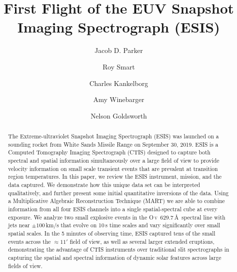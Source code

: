 \renewcommand\arcmin{\mbox{$^\prime$}}
\renewcommand\arcsec{\mbox{$^{\prime\prime}$}}

\newcommand{\rts}[1]{{\color{violet} RTS: #1}} %
\newcommand{\jdp}[1]{{\color{red} JDP: #1}} %
\newcommand{\cck}[1]{{\color{brown} #1}} %
\newcommand{\amy}[1]{{\color{cyan} ARW: #1}}

\newcommand{\spectralline}[3]{#1\,{\textsc{#2}}\ #3\,\AA } %
\newcommand{\ov}{\spectralline{O}{v}{629.7}}
\newcommand{\oiii}{\spectralline{O}{iii}{599.6}}
\newcommand{\oiv}{\spectralline{O}{iv}{608.4}}
\newcommand{\mgxbright}{\spectralline{Mg}{x}{609.8}}
\newcommand{\mgxdim}{\spectralline{Mg}{x}{624.9}}
\newcommand{\hei}{\spectralline{He}{i}{584.3}}
\newcommand{\heii}{\spectralline{He}{ii}{304}}
\newcommand{\siiv}{\spectralline{Si}{iv}{1394}}

\newcommand{\esispointing}{[18\arcsec, -19\arcsec]}
\newcommand{\esisroll}{$.85^{\circ}$}
\newcommand{\esisfov}{11.5\arcmin}
\newcommand{\aianearapogee}{\jdp{update this}\,UTC}






\title{First Flight of the EUV Snapshot Imaging Spectrograph (ESIS)}

\author{Jacob D. Parker}
\author{Roy Smart}
\author{Charles Kankelborg}
\author{Amy Winebarger}
\author{Nelson Goldsworth}

\begin{abstract}
    The Extreme-ultraviolet Snapshot Imaging Spectrograph (ESIS) was launched on a sounding rocket from White Sands Missile Range on September 30, 2019.
    ESIS is a Computed Tomography Imaging Spectrograph (CTIS) designed to capture both spectral and spatial information simultaneously over a large field of view to provide velocity information on small scale transient events that are prevalent at transition region temperatures.
    In this paper, we review the ESIS instrument, mission, and the data captured.
    We demonstrate how this unique data set can be interpreted qualitatively, and further present some initial quantitative inversions of the data.
    Using a Multiplicative Algebraic Reconstruction Technique (MART) we are able to combine information from all four ESIS channels into a single spatial-spectral cube at every exposure.
    We analyze two small explosive events in the \ov \ spectral line with jets  near $\pm 100$\,km/s that evolve on 10\,s time scales and vary significantly over small spatial scales.
    In the 5 minutes of observing time, ESIS captured tens of the small events across the $\approx 11'$ field of view, as well as several larger extended eruptions, demonstrating the advantage of CTIS instruments over traditional slit spectrographs in capturing the spatial and spectral information of dynamic solar features across large fields of view.
  	
\end{abstract} 

